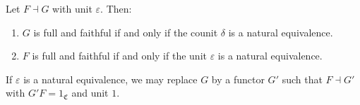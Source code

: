 Let $F \dashv G$ with unit $\varepsilon$. Then:
\begin{enumerate}
\item[(i)] $G$ is full and faithful if and only if the counit $\delta$ is a natural equivalence.
\item[(ii)] $F$ is full and faithful if and only if the unit $\varepsilon$ is a natural equivalence.
\end{enumerate}
If $\varepsilon$ is a natural equivalence, we may replace $G$ by a functor $G'$ such that $F \dashv G'$ with $G'F = 1_{\mathfrak{C}}$ and unit $1$.
